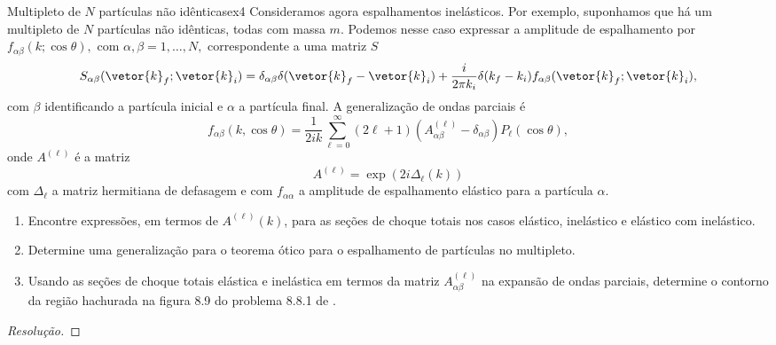 \begin{exercício}{Multipleto de \(N\) partículas não idênticas}{ex4}
   Consideramos agora espalhamentos inelásticos. Por exemplo, suponhamos que há um multipleto de \(N\) partículas não idênticas, todas com massa \(m.\)  Podemos nesse caso expressar a amplitude de espalhamento por \(f_{\alpha\beta}(k; \cos\theta),\) com \(\alpha, \beta = 1, \dots, N,\) correspondente a uma matriz \(S\)
   \begin{equation*}
      S_{\alpha\beta}(\vetor{k}_f;\vetor{k}_i) = \delta_{\alpha\beta}\delta(\vetor{k}_f - \vetor{k}_i) + \frac{i}{2\pi k_i}\delta(k_f - k_i) f_{\alpha\beta}(\vetor{k}_f; \vetor{k}_i),
   \end{equation*}
   com \(\beta\) identificando a partícula inicial e \(\alpha\) a partícula final. A generalização de ondas parciais é
   \begin{equation*}
      f_{\alpha\beta}(k,\cos\theta) = \frac{1}{2ik} \sum_{\ell = 0}^\infty (2\ell + 1)(A_{\alpha\beta}^{(\ell)} - \delta_{\alpha\beta})P_{\ell}(\cos\theta),
   \end{equation*}
   onde \(A^{(\ell)}\) é a matriz
   \begin{equation*}
      A^{(\ell)} = \exp(2i \Delta_{\ell}(k))
   \end{equation*}
   com \(\Delta_{\ell}\) a matriz hermitiana de defasagem e com \(f_{\alpha\alpha}\) a amplitude de espalhamento elástico para a partícula \(\alpha\).
   \begin{enumerate}[label=(\alph*)]
      \item Encontre expressões, em termos de \(A^{(\ell)}(k)\), para as seções de choque totais nos casos elástico, inelástico e elástico com inelástico.
      \item Determine uma generalização para o teorema ótico para o espalhamento de partículas no multipleto.
      \item Usando as seções de choque totais elástica e inelástica em termos da matriz \(A^{(\ell)}_{\alpha\beta}\) na expansão de ondas parciais, determine o contorno da região hachurada na figura 8.9 do problema 8.8.1 de \cite{gottfried}.
   \end{enumerate}
\end{exercício}
\begin{proof}[Resolução]
    
\end{proof}
